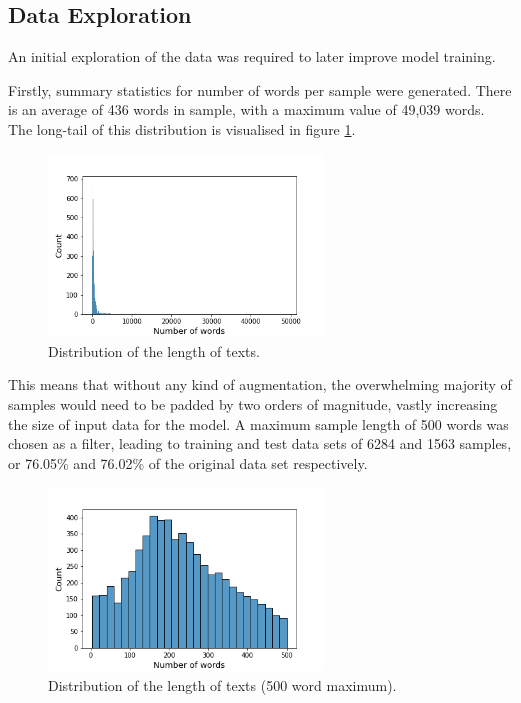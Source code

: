 \documentclass[12pt]{article}
\begin{document}
\subsection{Data Exploration}

An initial exploration of the data was required to later improve model training.


Firstly, summary statistics for number of words per sample were generated. There is an average of 436 words in sample, with a maximum value of 49,039 words. The long-tail of this distribution is visualised in figure \ref{hist1}.



\begin{figure}[ht]
\centering     %
\includegraphics[width=0.65\textwidth]{histogram_original_data1}
\caption{Distribution of the length of texts.}
\label{hist1}
\end{figure}

This means that without any kind of augmentation, the overwhelming majority of samples would need to be padded by two orders of magnitude, vastly increasing the size of input data for the model. A maximum sample length of 500 words was chosen as a filter, leading to training and test data sets of 6284 and 1563 samples, or 76.05\% and 76.02\% of the original data set respectively.


\begin{figure}[ht]
\centering     %
\includegraphics[width=0.65\textwidth]{histogram_original_data2}
\caption{Distribution of the length of texts (500 word maximum).}
\label{hist2}
\end{figure}
\end{document}
